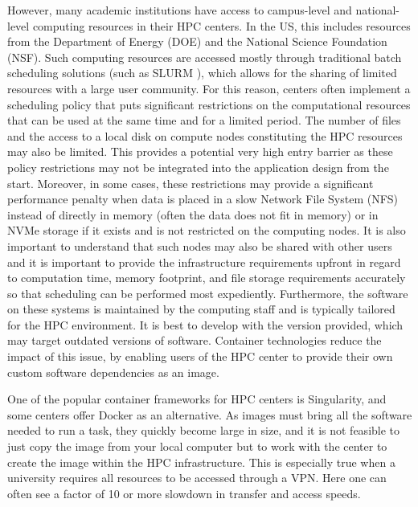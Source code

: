 \documentclass[utf8]{FrontiersinVancouver} %
\begin{document}
However, many academic institutions have access to campus-level and
national-level computing resources in their HPC centers. In the US,
this includes resources from the Department of Energy (DOE) and the
National Science Foundation (NSF). Such computing resources are
accessed mostly through traditional batch scheduling solutions (such
as SLURM \citep{www-slurm}), which allows for the sharing of limited
resources with a large user community. For this reason, centers often
implement a scheduling policy that puts significant restrictions on
the computational resources that can be used at the same time and for
a limited period. The number of files and the access to a local disk
on compute nodes constituting the HPC resources may also be limited.
This provides a potential very high entry barrier as these policy
restrictions may not be integrated into the application design from
the start.  Moreover, in some cases, these restrictions may provide a
significant performance penalty when data is placed in a slow Network
File System (NFS) instead of directly in memory (often the data does
not fit in memory) or in NVMe storage if it exists and is not
restricted on the computing nodes.  It is also important to understand
that such nodes may also be shared with other users and it is
important to provide the infrastructure requirements upfront in regard
to computation time, memory footprint, and file storage requirements
accurately so that scheduling can be performed most expediently.
Furthermore, the software on these systems is maintained by the
computing staff and is typically tailored for the HPC environment.  It
is best to develop with the version provided, which may target
outdated versions of software.  Container technologies reduce the
impact of this issue, by enabling users of the HPC center to provide
their own custom software dependencies as an image.

One of the popular container frameworks for HPC centers is
Singularity, and some centers offer Docker as an alternative. As
images must bring all the software needed to run a task, they quickly
become large in size, and it is not feasible to just copy the image
from your local computer but to work with the center to create the
image within the HPC infrastructure. This is especially true when a
university requires all resources to be accessed through a VPN. Here
one can often see a factor of 10 or more slowdown in transfer and
access speeds.
\end{document}
